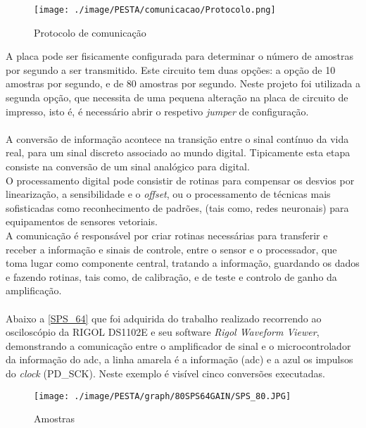 \begin{figure}[H]
	\centering
	\texttt{[image: ./image/PESTA/comunicacao/Protocolo.png]}
	\caption{Protocolo de comunicação}
	\label{Protocolo}
\end{figure}
A placa 
pode ser fisicamente configurada para determinar o número de amostras por segundo a ser transmitido. Este circuito tem duas opções: a opção de 10 amostras por segundo, e de 80 amostras por segundo. Neste projeto foi utilizada a segunda opção, que necessita de uma pequena alteração na placa de circuito de impresso, isto é, é necessário abrir o respetivo \textit{jumper} de configuração.
\\
\\
A conversão de informação acontece na transição entre o sinal contínuo da vida real, para um sinal discreto associado ao mundo digital. Tipicamente esta etapa consiste na conversão de um sinal analógico para digital.\cite{book-9}
\\
O processamento digital pode consistir de rotinas para compensar os desvios por linearização, a sensibilidade e o \textit{offset}, ou o processamento de técnicas mais sofisticadas como reconhecimento de padrões, (tais como, redes neuronais) para equipamentos de sensores vetoriais.\cite{book-9}
\\
A comunicação é responsável por criar rotinas necessárias para transferir e receber a informação e sinais de controle, entre o sensor e o processador, que toma lugar como componente central, tratando a informação, guardando os dados e fazendo rotinas, tais como, de calibração, e de teste e controlo de ganho da amplificação. \cite{book-9}
\\
\\
Abaixo a \autoref{SPS_64} que foi adquirida do trabalho realizado recorrendo ao osciloscópio da RIGOL DS1102E e seu software \textit{Rigol Waveform Viewer}, demonstrando a comunicação entre o amplificador de sinal e o microcontrolador da informação do \acs{adc}, a linha amarela é a informação (\acs{adc}) e a azul os impulsos do \textit{clock} (PD\_SCK). Neste exemplo é visível cinco conversões executadas.
\\
\begin{figure}[H]
	\centering
	\texttt{[image: ./image/PESTA/graph/80SPS64GAIN/SPS\_80.JPG]}
	\caption{Amostras}
	\label{SPS_64}
\end{figure}

